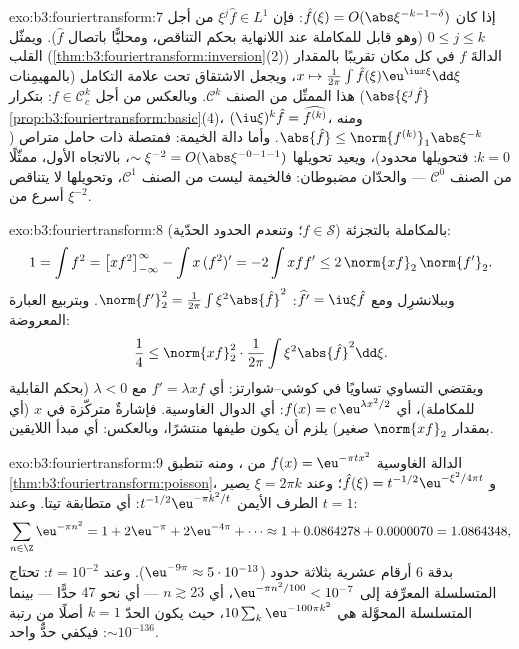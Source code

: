 \begin{solution}{exo:b3:fouriertransform:7}
إذا كان $\hat f(\xi) = O(\abs\xi^{-k-1-\delta})$: فإن $\xi^j\hat f
\in L^1$ من أجل $0 \leq j \leq k$ (وهو قابل للمكاملة عند
اللانهاية بحكم التناقص، ومحليًّا باتصال $\hat f$). ويمثّل القلب
(\cref{thm:b3:fouriertransform:inversion}(2)) الدالةَ $f$ في كل مكان تقريبًا بالمقدار $x \mapsto \frac1{2\pi}\int\hat f(\xi)\eu^{\iu
x\xi}\dd\xi$،
ويجعل الاشتقاق تحت علامة التكامل (بالمهيمِنات $\abs{\xi^j\hat f}$) هذا
الممثّل من الصنف $\mathcal C^k$. وبالعكس من أجل $f \in \mathcal C_c^k$: بتكرار
\cref{prop:b3:fouriertransform:basic}(4)، $(\iu\xi)^k\hat f = \widehat{f^{(k)}}$، ومنه $\abs{\hat f} \leq
\norm{f^{(k)}}_1\abs\xi^{-k}$. وأما دالة الخيمة: فمتصلة
ذات حامل متراص ($k = 0$: فتحويلها محدود)، ويعيد تحويلها $\sim \xi^{-2} = O(\abs\xi^{-0-1-1})$،
بالاتجاه الأول، ممثّلًا من الصنف $\mathcal C^0$ --- والحدّان
مضبوطان: فالخيمة ليست من الصنف $\mathcal C^1$، وتحويلها لا
يتناقص أسرع من $\xi^{-2}$.
\end{solution}

\begin{solution}{exo:b3:fouriertransform:8}
بالمكاملة بالتجزئة ($f \in \mathcal S$؛ وتنعدم الحدود الحدّية):
\[
1 = \int f^2 = \bigl[xf^2\bigr]_{-\infty}^{\infty} - \int
x\,(f^2)' = -2\int xff' \leq 2\,\norm{xf}_2\,\norm{f'}_2 .
\]
وببلانشرِل ومع $\widehat{f'} = \iu\xi\hat f$: $\norm{f'}_2^2 = \frac1{2\pi}\int\xi^2\abs{\hat f}^2$. وبتربيع العبارة المعروضة:
\[
\frac14 \leq \norm{xf}_2^2\cdot\frac1{2\pi}
\int\xi^2\abs{\hat f}^2\dd\xi .
\]
ويقتضي التساوي تساويًا في كوشي--شوارتز: أي $f' =
\lambda xf$ مع
$\lambda < 0$ (بحكم القابلية للمكاملة)، أي $f(x) =
c\,\eu^{\lambda x^2/2}$: أي الدوال
الغاوسية. فإشارةٌ متركّزة في $x$ (أي بمقدار $\norm{xf}_2$ صغير)
يلزم أن يكون طيفها منتشرًا، وبالعكس: أي مبدأ اللايقين.
\end{solution}

\begin{solution}{exo:b3:fouriertransform:9}
الدالة الغاوسية $f(x) = \eu^{-\pi tx^2}$ من ، ومنه تنطبق \cref{thm:b3:fouriertransform:poisson}،
و $\hat f(\xi) = t^{-1/2}\eu^{-\xi^2/4\pi t}$؛ وعند $\xi = 2\pi
k$ يصير الطرف الأيمن $t^{-1/2}\eu^{-\pi k^2/t}$: أي متطابقة
تيتا. وعند $t = 1$:
\[
\sum_{n\in\Z}\eu^{-\pi n^2} = 1 + 2\eu^{-\pi} + 2\eu^{-4\pi} +
\cdots \approx 1 + 0.0864278 + 0.0000070 = 1.0864348,
\]
بدقة $6$ أرقام عشرية بثلاثة حدود ($\eu^{-9\pi}
\approx 5\cdot10^{-13}$). وعند
$t = 10^{-2}$: تحتاج المتسلسلة المعرِّفة إلى $\eu^{-\pi n^2/100} < 10^{-7}$، أي $n \gtrsim
23$
--- أي نحو $47$ حدًّا --- بينما المتسلسلة المحوَّلة هي $10\sum_k\eu^{-100\pi k^2}$،
حيث يكون الحدّ $k = 1$ أصلًا من رتبة $\sim 10^{-136}$: فيكفي
حدٌّ واحد.
\end{solution}

